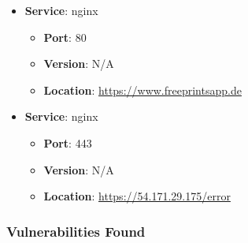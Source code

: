 \documentclass{article}
\begin{document}
\begin{itemize}
    
        \item \textbf{Service}: nginx
        \begin{itemize}
            \item \textbf{Port}: 80
            \item \textbf{Version}:  N/A 
            \item \textbf{Location}: \href{ https://www.freeprintsapp.de }{ https://www.freeprintsapp.de }
        \end{itemize}
    
        \item \textbf{Service}: nginx
        \begin{itemize}
            \item \textbf{Port}: 443
            \item \textbf{Version}:  N/A 
            \item \textbf{Location}: \href{ https://54.171.29.175/error }{ https://54.171.29.175/error }
        \end{itemize}
    
\end{itemize}


\subsubsection*{Vulnerabilities Found}
\end{document}
